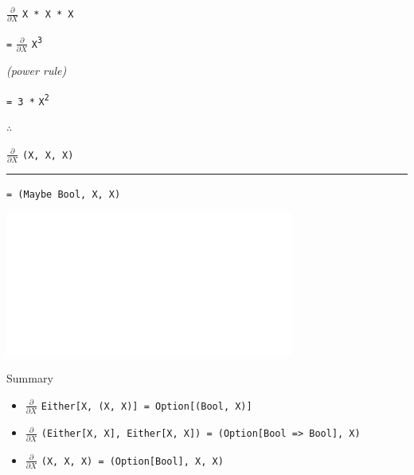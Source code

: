 \begin{frame}
\begin{center}
$\frac{\partial}{\partial X}$ \lstinline{X * X * X}

\lstinline{=} $\frac{\partial}{\partial X}$ \lstinline{X}\textsuperscript{\lstinline{3}}

\tiny{\emph{(power rule)}}\normalsize{}

\lstinline{= 3 *} \lstinline{X}\textsuperscript{\lstinline{2}}
\end{center}
\end{frame}


\begin{frame}
\begin{block}{$\therefore$}
\begin{center}
$\frac{\partial}{\partial X}$ \lstinline{(X, X, X)}

\par\noindent\rule{\textwidth}{0.4pt}

\lstinline{= (Maybe Bool, X, X)}
\end{center}
\end{block}
\end{frame}


\begin{frame}
\begin{center}
\includegraphics[width=0.3\textheight]{image/crosseyed-blank.png}
\end{center}
\begin{block}{Summary}
\begin{itemize}
  \item \scriptsize{$\frac{\partial}{\partial X}$ \lstinline{Either[X, (X, X)] = Option[(Bool, X)]}}
  \item \scriptsize{$\frac{\partial}{\partial X}$ \lstinline{(Either[X, X], Either[X, X]) = (Option[Bool => Bool], X)}}
  \item \scriptsize{$\frac{\partial}{\partial X}$ \lstinline{(X, X, X) = (Option[Bool], X, X)}}
\end{itemize}
\end{block}
\end{frame}

